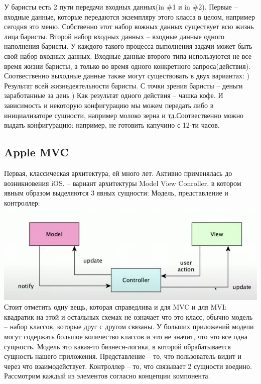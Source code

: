 \documentclass{article}
\begin{document}
    \newline
    У баристы есть 2 пути передачи входных данных(in \#1 и in \#2). Первые -- входные данные, которые передаются экземпляру этого класса в целом, например сегодня это меню. Собственно этот набор вожных данных существует всю жизнь лица баристы. 
    \newline
    Второй набор входных данных -- входные данные одного наполнения баристы. У каждого такого процесса выполнения задачи может быть свой набор входных данных.  Входные данные второго типа используются не все время жизни баристы, а только во время одного конкретного запроса(действия). Соотвественно выходные данные также могут существовать в двух вариантах: 
    ) Результат всей жизнедеятельности баристы. С точки зрения баристы -- деньги заработанные за день
    ) Как результат одного действия -- чашка кофе.
    \newline
    И зависимость и некоторую конфигурацию мы можем передать либо в инициализаторе сущности, например молоко зерна и тд.Соотвественно можно выдать конфигурацию: например, не готовить капучино с 12-ти часов. 
    \subsection{Apple MVC} 
    Первая, классическая архитектура, ей много лет. Активно применялась до возникновения iOS. 
    \newline
     -- вариант архитектуры Model View Conroller, в котором явным образом выделяются 3 явных сущности: Модель, представление и контроллер: 
    \newline
    \includegraphics[scale = 0.5]{pic/Снимок экрана 2023-07-30 в 18.38.12.png}
    \newline
    Стоит отметить одну вещь, которая справедлива и для MVC и для MVI: квадратик на этой и остальных схемах не означает что это класс, обычно модель -- набор классов, которые друг с другом связаны. У больших приложений модели могут содержать большое количество классов и это не значит, что это все одна сущность. 
    \newline
    Модель это какая-то бизнесн-логика, в которой обрабатывается сущность нашего приложения. 
    \newline
    Представление -- то, что пользователь видит и через что взаимодействует. 
    \newline
    Контроллер -- то, что связывает 2 сущности воедино.
    \newline
    Рассмотрим каждый из элементов согласно концепции компонента. 
\end{document}
